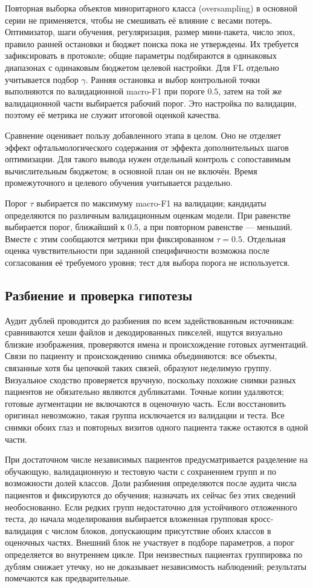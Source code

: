 \documentclass{misisarticle}
\begin{document}
Повторная выборка объектов миноритарного класса (oversampling) в основной серии не применяется, чтобы не смешивать её влияние с весами потерь. Оптимизатор, шаги обучения, регуляризация, размер мини-пакета, число эпох, правило ранней остановки и бюджет поиска пока не утверждены. Их требуется зафиксировать в протоколе; общие параметры подбираются в одинаковых диапазонах с одинаковым бюджетом целевой настройки. Для FL отдельно учитывается подбор $\gamma$. Ранняя остановка и выбор контрольной точки выполняются по валидационной macro-F1 при пороге $0.5$, затем на той же валидационной части выбирается рабочий порог. Это настройка по валидации, поэтому её метрика не служит итоговой оценкой качества.

Сравнение оценивает пользу добавленного этапа в целом. Оно не отделяет эффект офтальмологического содержания от эффекта дополнительных шагов оптимизации. Для такого вывода нужен отдельный контроль с сопоставимым вычислительным бюджетом; в основной план он не включён. Время промежуточного и целевого обучения учитывается раздельно.

Порог $\tau$ выбирается по максимуму macro-F1 на валидации; кандидаты определяются по различным валидационным оценкам модели. При равенстве выбирается порог, ближайший к $0.5$, а при повторном равенстве --- меньший. Вместе с этим сообщаются метрики при фиксированном $\tau=0.5$. Отдельная оценка чувствительности при заданной специфичности возможна после согласования её требуемого уровня; тест для выбора порога не используется.

\subsection{Разбиение и проверка гипотезы}
Аудит дублей проводится до разбиения по всем задействованным источникам: сравниваются хеши файлов и декодированных пикселей, ищутся визуально близкие изображения, проверяются имена и происхождение готовых аугментаций. Связи по пациенту и происхождению снимка объединяются: все объекты, связанные хотя бы цепочкой таких связей, образуют неделимую группу. Визуальное сходство проверяется вручную, поскольку похожие снимки разных пациентов не обязательно являются дубликатами. Точные копии удаляются; готовые аугментации не включаются в оценочную часть. Если восстановить оригинал невозможно, такая группа исключается из валидации и теста. Все снимки обоих глаз и повторных визитов одного пациента также остаются в одной части.

При достаточном числе независимых пациентов предусматривается разделение на обучающую, валидационную и тестовую части с сохранением групп и по возможности долей классов. Доли разбиения определяются после аудита числа пациентов и фиксируются до обучения; назначать их сейчас без этих сведений необоснованно. Если редких групп недостаточно для устойчивого отложенного теста, до начала моделирования выбирается вложенная групповая кросс-валидация с числом блоков, допускающим присутствие обоих классов в оценочных частях. Внешний блок не участвует в подборе параметров, а порог определяется во внутреннем цикле. При неизвестных пациентах группировка по дублям снижает утечку, но не доказывает независимость наблюдений; результаты помечаются как предварительные.
\end{document}
